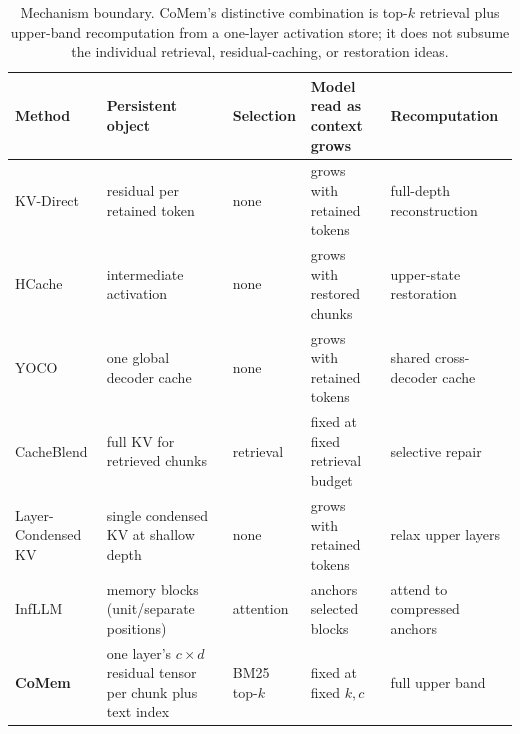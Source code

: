 \begin{table}[t]
\centering
\small
\setlength{\tabcolsep}{3pt}
\begin{tabular}{@{}>{\raggedright\arraybackslash}p{}
>{\raggedright\arraybackslash}p{}
>{\raggedright\arraybackslash}p{}
>{\raggedright\arraybackslash}p{}
>{\raggedright\arraybackslash}p{}@{}}
\toprule
\textbf{Method} & \textbf{Persistent object} & \textbf{Selection} &
\textbf{Model read as context grows} & \textbf{Recomputation} \\
\midrule
KV-Direct\newline\citep{kvdirect} & residual per retained token & none & grows with retained tokens &
full-depth reconstruction \\
HCache\newline\citep{hcache} & intermediate activation & none & grows with restored chunks &
upper-state restoration \\
YOCO\newline\citep{yoco} & one global decoder cache & none & grows with retained tokens &
shared cross-decoder cache \\
CacheBlend\newline\citep{cacheblend} & full KV for retrieved chunks & retrieval & fixed at fixed retrieval
budget & selective repair \\
Layer-Condensed KV\newline\citep{lckv} & single condensed KV at shallow depth & none &
grows with retained tokens & relax upper layers \\
InfLLM\newline\citep{infllm} & memory blocks (unit/separate positions) & attention & anchors
selected blocks & attend to compressed anchors \\
\textbf{CoMem} & one layer's $c\!\times\!d$ residual tensor per chunk plus text
index & BM25 top-$k$ & fixed at fixed $k,c$ & full upper band \\
\bottomrule
\end{tabular}
\caption{Mechanism boundary.  CoMem's distinctive combination is top-$k$
retrieval plus upper-band recomputation from a one-layer activation store; it
does not subsume the individual retrieval, residual-caching, or restoration
ideas.}
\label{tab:method-boundary}
\end{table}

\FloatBarrier


